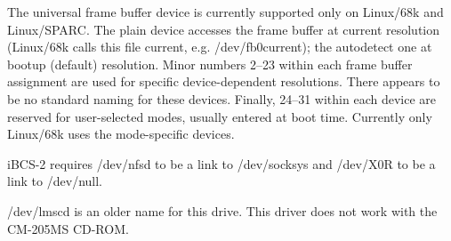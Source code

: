 \noindent
The universal frame buffer device is currently supported only on
Linux/68k and Linux/SPARC.  The plain device accesses the frame
buffer at current resolution (Linux/68k calls this file {\file
current}, e.g. {\file /dev/fb0current}); the {\file autodetect} one at
bootup (default) resolution.  Minor numbers 2--23 within each frame
buffer assignment are used for specific device-dependent resolutions.
There appears to be no standard naming for these devices.  Finally,
24--31 within each device are reserved for user-selected modes,
usually entered at boot time.  Currently only Linux/68k uses the
mode-specific devices.

\begin{devicelist}
\end{devicelist}

\begin{devicelist}
\end{devicelist}

\noindent
iBCS-2 requires {\file /dev/nfsd} to be a link to {\file /dev/socksys}
and {\file /dev/X0R} to be a link to {\file /dev/null}.

\begin{devicelist}
\end{devicelist}

\noindent
{\file /dev/lmscd} is an older name for this drive.  This driver does
not work with the CM-205MS CD-ROM.

\begin{devicelist}
\\
	\minordots
	\minordots
	\minordots
	\minordots
\end{devicelist}

